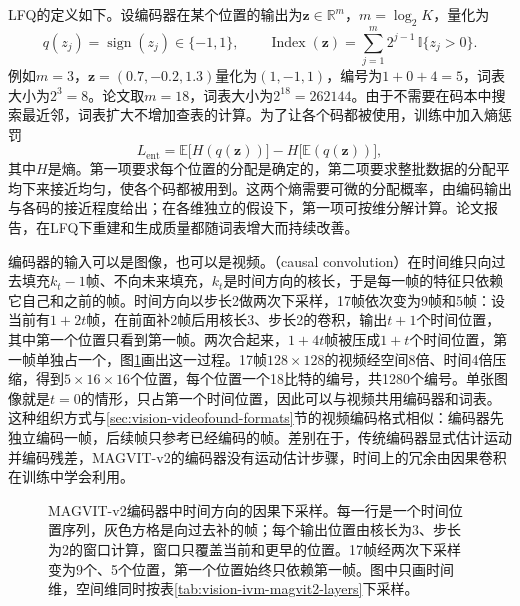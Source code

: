 LFQ的定义如下。设编码器在某个位置的输出为$\bm z\in\mathbb R^{m}$，$m=\log_2K$，量化为
\begin{equation}
  q(z_j)=\operatorname{sign}(z_j)\in\{-1,1\},\qquad
  \operatorname{Index}(\bm z)=\sum_{j=1}^{m}2^{j-1}\,\mathbb I\{z_j>0\}.
  \label{eq:vision-ivm-lfq}
\end{equation}
例如$m=3$，$\bm z=(0.7,-0.2,1.3)$量化为$(1,-1,1)$，编号为$1+0+4=5$，词表大小为$2^3=8$。论文取$m=18$，词表大小为$2^{18}=262144$。由于不需要在码本中搜索最近邻，词表扩大不增加查表的计算。为了让各个码都被使用，训练中加入熵惩罚
\begin{equation}
  L_{\mathrm{ent}}=\mathbb E\bigl[H(q(\bm z))\bigr]-H\bigl[\mathbb E(q(\bm z))\bigr],
  \label{eq:vision-ivm-lfq-entropy}
\end{equation}
其中$H$是熵。第一项要求每个位置的分配是确定的，第二项要求整批数据的分配平均下来接近均匀，使各个码都被用到。这两个熵需要可微的分配概率，由编码输出与各码的接近程度给出；在各维独立的假设下，第一项可按维分解计算。论文报告，在LFQ下重建和生成质量都随词表增大而持续改善。

编码器的输入可以是图像，也可以是视频。（causal convolution）在时间维只向过去填充$k_t-1$帧、不向未来填充，$k_t$是时间方向的核长，于是每一帧的特征只依赖它自己和之前的帧。时间方向以步长2做两次下采样，17帧依次变为9帧和5帧：设当前有$1+2t$帧，在前面补2帧后用核长3、步长2的卷积，输出$t+1$个时间位置，其中第一个位置只看到第一帧。两次合起来，$1+4t$帧被压成$1+t$个时间位置，第一帧单独占一个，图\ref{fig:vision-ivm-causal-temporal}画出这一过程。17帧$128\times128$的视频经空间8倍、时间4倍压缩，得到$5\times16\times16$个位置，每个位置一个18比特的编号，共1280个编号。单张图像就是$t=0$的情形，只占第一个时间位置，因此可以与视频共用编码器和词表。这种组织方式与\ref{sec:vision-videofound-formats}节的视频编码格式相似：编码器先独立编码一帧，后续帧只参考已经编码的帧。差别在于，传统编码器显式估计运动并编码残差，MAGVIT-v2的编码器没有运动估计步骤，时间上的冗余由因果卷积在训练中学会利用。

\begin{figure}[htbp]
  \centering
  
  \caption{MAGVIT-v2编码器中时间方向的因果下采样。每一行是一个时间位置序列，灰色方格是向过去补的帧；每个输出位置由核长为3、步长为2的窗口计算，窗口只覆盖当前和更早的位置。17帧经两次下采样变为9个、5个位置，第一个位置始终只依赖第一帧。图中只画时间维，空间维同时按表\ref{tab:vision-ivm-magvit2-layers}下采样。}
  \label{fig:vision-ivm-causal-temporal}
\end{figure}

